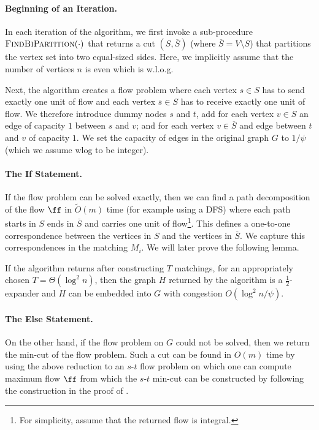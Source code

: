 \paragraph{Beginning of an Iteration.} In each iteration of the algorithm, we first invoke a sub-procedure $\textsc{FindBiPartition}(\cdot)$ that returns a cut $(S,\overline{S})$ (where $\overline{S} = V \setminus S$) that partitions the vertex set into two equal-sized sides. Here, we implicitly assume that the number of vertices $n$ is even which is w.l.o.g. 

Next, the algorithm creates a flow problem where each vertex $s \in S$ has to send exactly one unit of flow and each vertex $\overline{s} \in S$ has to receive exactly one unit of flow. We therefore introduce dummy nodes $s$ and $t$, add for each vertex $v \in S$ an edge of capacity $1$ between $s$ and $v$; and for each vertex $v \in \overline{S}$ and edge between $t$ and $v$ of capacity $1$. We set the capacity of edges in the original graph $G$ to $1/\psi$ (which we assume wlog to be integer).

\paragraph{The If Statement.} If the flow problem can be solved exactly, then we can find a path decomposition of the flow $\ff$ in $\tilde{O}(m)$ time (for example using a DFS) where each path starts in $S$ ends in $\overline{S}$ and carries one unit of flow\footnote{For simplicity, assume that the returned flow is integral.}. This defines a one-to-one correspondence between the vertices in $S$ and the vertices in $\overline{S}$. We capture this correspondences in the matching $M_i$. We will later prove the following lemma.

\begin{lemma}
If the algorithm returns after constructing $T$ matchings, for an appropriately chosen $T = \Theta(\log^2 n)$, then the graph $H$ returned by the algorithm is a $\frac{1}{2}$-expander and $H$ can be embedded into $G$ with congestion $O(\log^2 n/ \psi)$.
\end{lemma}

\paragraph{The Else Statement.} On the other hand, if the flow problem on $G$ could not be solved, then we return the min-cut of the flow problem. Such a cut can be found in $O(m)$ time by using the above reduction to an $s$-$t$ flow problem on which one can compute maximum flow $\ff$ from which the $s$-$t$ min-cut can be constructed by following the construction in the proof of .

